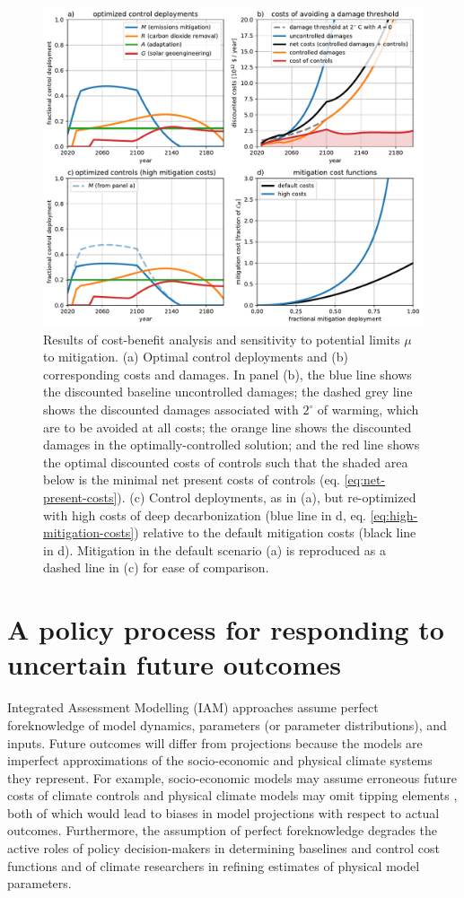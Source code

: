 \documentclass[9pt,twocolumn,twoside,lineno]{pnas-new}
\begin{document}
\begin{figure}%
\centering
\includegraphics[width=11.4cm]{figures/default-temp_controls_and_damages.pdf}
\caption{Results of cost-benefit analysis and sensitivity to potential limits $\mu$ to mitigation. (a) Optimal control deployments and (b) corresponding costs and damages. In panel (b), the blue line shows the discounted baseline uncontrolled damages; the dashed grey line shows the discounted damages associated with $2^{\circ}$ of warming, which are to be avoided at all costs; the orange line shows the discounted damages in the optimally-controlled solution; and the red line shows the optimal discounted costs of controls such that the shaded area below is the minimal net present costs of controls (eq. \ref{eq:net-present-costs}). (c) Control deployments, as in (a), but re-optimized with high costs of deep decarbonization (blue line in d, eq. \ref{eq:high-mitigation-costs}) relative to the default mitigation costs (black line in d). Mitigation in the default scenario (a) is reproduced as a dashed line in (c) for ease of comparison.}
\label{fig:cost-effectiveness}
\end{figure}

\section*{A policy process for responding to uncertain future outcomes}

Integrated Assessment Modelling (IAM) approaches assume perfect foreknowledge of model dynamics, parameters (or parameter distributions), and inputs. Future outcomes will differ from projections because the models are imperfect approximations of the socio-economic and physical climate systems they represent. For example, socio-economic models may assume erroneous future costs of climate controls and physical climate models may omit tipping elements \citep{steffen_trajectories_2018}, both of which would lead to biases in model projections with respect to actual outcomes. Furthermore, the assumption of perfect foreknowledge degrades the active roles of policy decision-makers in determining baselines and control cost functions and of climate researchers in refining estimates of physical model parameters.
\end{document}
